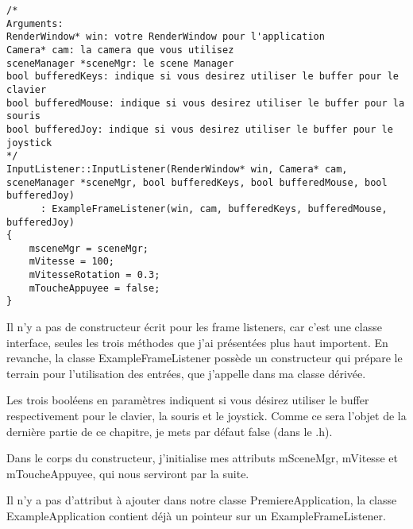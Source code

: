 \documentclass[10pt,a4paper]{report}
\begin{document}
\begin{lstlisting}[caption={InputListener.cpp}]
/*
Arguments:
RenderWindow* win: votre RenderWindow pour l'application
Camera* cam: la camera que vous utilisez
sceneManager *sceneMgr: le scene Manager
bool bufferedKeys: indique si vous desirez utiliser le buffer pour le clavier
bool bufferedMouse: indique si vous desirez utiliser le buffer pour la souris
bool bufferedJoy: indique si vous desirez utiliser le buffer pour le joystick
*/
InputListener::InputListener(RenderWindow* win, Camera* cam, sceneManager *sceneMgr, bool bufferedKeys, bool bufferedMouse, bool bufferedJoy) 
      : ExampleFrameListener(win, cam, bufferedKeys, bufferedMouse, bufferedJoy)
{
    msceneMgr = sceneMgr;
    mVitesse = 100;
    mVitesseRotation = 0.3;
    mToucheAppuyee = false;
}
\end{lstlisting}



Il n'y a pas de constructeur \'ecrit pour les frame listeners, car c'est une classe interface, seules les trois m\'ethodes que j'ai pr\'esent\'ees plus haut importent. En revanche, la classe ExampleFrameListener poss\`ede un constructeur qui pr\'epare le terrain pour l'utilisation des entr\'ees, que j'appelle dans ma classe d\'eriv\'ee. 

Les trois bool\'eens en param\`etres indiquent si vous d\'esirez utiliser le buffer respectivement pour le clavier, la souris et le joystick. Comme ce sera l'objet de la derni\`ere partie de ce chapitre, je mets par d\'efaut false (dans le .h).

Dans le corps du constructeur, j'initialise mes attributs mSceneMgr, mVitesse et mToucheAppuyee, qui nous serviront par la suite.

Il n'y a pas d'attribut \`{a} ajouter dans notre classe PremiereApplication, la classe ExampleApplication contient d\'ej\`{a} un pointeur sur un ExampleFrameListener.

       
\end{document}
